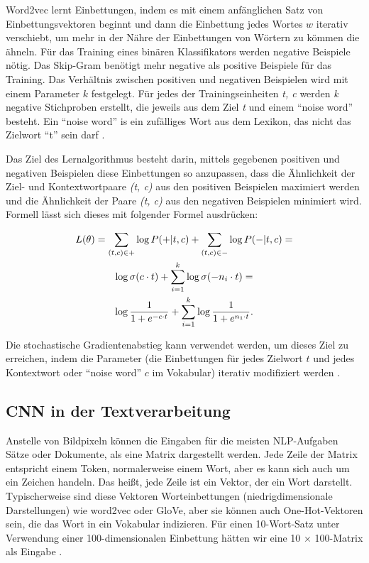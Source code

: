 Word2vec lernt Einbettungen, indem es mit einem anfänglichen Satz von Einbettungsvektoren beginnt und dann die Einbettung jedes Wortes $w$ iterativ verschiebt, um mehr in der Nähre der Einbettungen von Wörtern zu kömmen die ähneln. Für das Training eines binären Klassifikators werden negative Beispiele nötig. Das Skip-Gram benötigt mehr negative als positive Beispiele für das Training. Das Verhältnis zwischen positiven und negativen Beispielen wird mit einem Parameter $k$ festgelegt. Für jedes der Trainingseinheiten \textit{t, c} werden \textit{k} negative Stichproben erstellt, die jeweils aus dem Ziel \textit{t} und einem \enquote{noise word} besteht. Ein \enquote{noise word} is ein zufälliges Wort aus dem Lexikon, das nicht das Zielwort \enquote{t} sein darf \cite*[113]{Jurafskya}.

Das Ziel des Lernalgorithmus besteht darin, mittels gegebenen positiven und negativen Beispielen diese Einbettungen so anzupassen, dass die Ähnlichkeit der Ziel- und Kontextwortpaare \textit{(t, c)} aus den positiven Beispielen maximiert werden und die Ähnlichkeit der Paare \textit{(t, c)} aus den negativen Beispielen minimiert wird. Formell lässt sich dieses mit folgender Formel ausdrücken:

\begin{gather} \label{Formel3_5}
    L(\theta) = \sum_{(t,c)\in +}\log P(+|t,c)+\sum_{(t,c)\in -} \log P(-|t,c) =  \notag\\
    \log \sigma(c \cdot t)+\sum^{k}_{i=1}\log \sigma(-n_{i} \cdot t) = \notag\\
    \log \frac{1}{1+e^{-c \cdot t}}+\sum^{k}_{i=1}\log\frac{1}{1+e^{n_{1} \cdot t}}.
\end{gather}

Die stochastische Gradientenabstieg kann verwendet werden, um dieses Ziel zu erreichen, indem die Parameter (die Einbettungen für jedes Zielwort $t$ und jedes Kontextwort oder \enquote{noise word} $c$ im Vokabular) iterativ modifiziert werden \cite*[114]{Jurafskya}.


\subsection{CNN in der Textverarbeitung}
Anstelle von Bildpixeln können die Eingaben für die meisten NLP-Aufgaben Sätze oder Dokumente, als eine Matrix dargestellt werden. Jede Zeile der Matrix entspricht einem Token, normalerweise einem Wort, aber es kann sich auch um ein Zeichen handeln. Das heißt, jede Zeile ist ein Vektor, der ein Wort darstellt. Typischerweise sind diese Vektoren Worteinbettungen (niedrigdimensionale Darstellungen) wie word2vec oder GloVe, aber sie können auch One-Hot-Vektoren sein, die das Wort in ein Vokabular indizieren. Für einen 10-Wort-Satz unter Verwendung einer 100-dimensionalen Einbettung hätten wir eine 10 × 100-Matrix als Eingabe \cite*{Zhang}.

